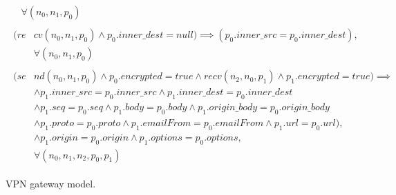 \begin{figure}[h]
{\begin{subequations}
\begin{align}
\begin{split}
					& \forall (n_{0},n_{1}, p_{0})
				\end{split} \\
				\begin{split}
					\label{vpn6}
					(re& cv(n_{0},  n_{1}, p_{0}) \wedge p_{0}.inner\_dest = null ) \implies  (p_{0}.inner\_src = p_{0}.inner\_dest), \\
					& \forall (n_{0},n_{1}, p_{0})
				\end{split} 			\\
				\begin{split}
					\label{vpn7}
					(se& nd(n_{0}, n_{1}, p_{0}) \wedge p_{0}.encrypted = true \wedge recv(n_{2}, n_{0}, p_{1}) \wedge p_{1}.encrypted = true) \implies \\
			& \wedge p_{1}.inner\_src = p_{0}.inner\_src \wedge p_{1}.inner\_dest = p_{0}.inner\_dest\\
			&  \wedge p_{1}.seq = p_{0}.seq \wedge p_{1}.body = p_{0}.body \wedge p_{1}.origin\_body = p_{0}.origin\_body\\
			& \wedge p_{1}.proto = p_{0}.proto \wedge p_{1}.emailFrom = p_{0}.emailFrom \wedge p_{1}.url = p_{0}.url), \\
			& \wedge p_{1}.origin = p_{0}.origin   \wedge p_{1}.options = p_{0}.options  , \\
			& \forall (n_{0},n_{1}, n_{2},p_{0},p_{1})
				\end{split} 
			\end{align}
		\end{subequations}
	}%
	\caption{VPN gateway model.}
	\label{mail-server_model}
\end{figure}
